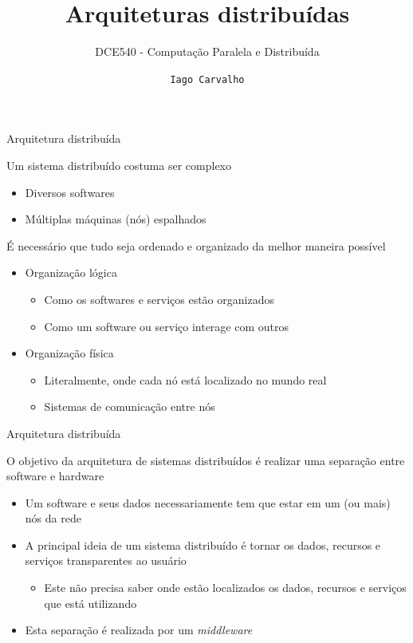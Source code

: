 \documentclass[compress]{beamer}
\title{Arquiteturas distribuídas}
\subtitle{DCE540 - Computação Paralela e Distribuída}
\author{\texttt{Iago Carvalho}}
\institute{\texttt{Departamento de Ciência da Computação}}
\begin{document}
\begin{frame}
\titlepage

\end{frame}


\begin{frame}{Arquitetura distribuída}

Um sistema distribuído costuma ser complexo
\begin{itemize}
    \item Diversos softwares
    \item Múltiplas máquinas (nós) espalhados
\end{itemize}

\vspace{0.5cm}

É necessário que tudo seja ordenado e organizado da melhor maneira possível
\begin{itemize}
    \item Organização lógica
    \begin{itemize}
        \item Como os softwares e serviços estão organizados 
        \item Como um software ou serviço interage com outros
    \end{itemize}
    \item Organização física
    \begin{itemize}
        \item Literalmente, onde cada nó está localizado no mundo real
        \item Sistemas de comunicação entre nós
    \end{itemize}
\end{itemize}
\end{frame}



\begin{frame}{Arquitetura distribuída}

O objetivo da arquitetura de sistemas distribuídos é realizar uma separação entre software e hardware
\begin{itemize}
    \item Um software e seus dados necessariamente tem que estar em um (ou mais) nós da rede
    \item A principal ideia de um sistema distribuído é tornar os dados, recursos e serviços transparentes ao usuário
    \begin{itemize}
        \item Este não precisa saber onde estão localizados os dados, recursos e serviços que está utilizando
    \end{itemize}
    \item Esta separação é realizada por um \textit{middleware}
\end{itemize}

\end{frame}
\end{document}
